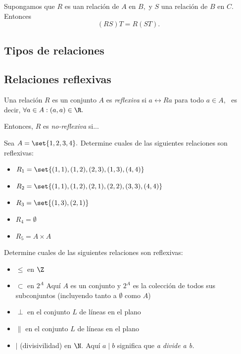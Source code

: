 	\begin{thm}
		Supongamos que $R$ es uan relación de $A$ en $B,$ y $S$ una relación de $B$ en $C.$ Entonces
		$$
		(RS)T=R(ST).
		$$
	\end{thm}
	


\subsection{Tipos de relaciones}

\subsection{Relaciones reflexivas}


	
	Una relación $R$ es un conjunto $A$ es \emph{reflexiva} si $a\rel{R}a$ para todo $a\in A$, \, es decir, $\forall a \in A: (a,a)\in \R.$ 
	
	Entonces, $R$ es \emph{no-reflexiva} si...



	\begin{problema}
		\label{lip:exmp:2.5}
		Sea $A=\set{1,2,3,4}.$ Determine cuales de las siguientes relaciones son reflexivas:
		\begin{itemize}
			\item $R_{1}=\set{(1,1),(1,2),(2,3),(1,3),(4,4)}$ 
			\item $R_{2}=\set{(1,1),(1,2),(2,1),(2,2),(3,3),(4,4)}$ 
			\item $R_{3}=\set{(1,3),(2,1)}$
			\item $R_{4}=\emptyset$
			\item $R_{5}=A \times A$
		\end{itemize}
		
	\end{problema}
	



	\begin{problema}
		\label{lip:exmp:2.6}
		Determine cuales de las siguientes relaciones son reflexivas:
		\begin{itemize}
			\item $\leq$ en $\Z$ 
			\item $\subset$ en $2^{A}$ 
			Aquí $A$ es un conjunto y $2^{A}$ es la colección de todos sus subconjuntos (incluyendo tanto a $\emptyset$ como $A$) 
			\item $\perp$ en el conjunto $L$ de líneas en el plano 
			\item $\parallel$ en el conjunto $L$ de líneas en el plano 
			\item $\mid$ (divisivilidad) en $\N.$  Aquí $a\mid b$ significa que \emph{a divide a b.} 
		\end{itemize} 
	\end{problema}


